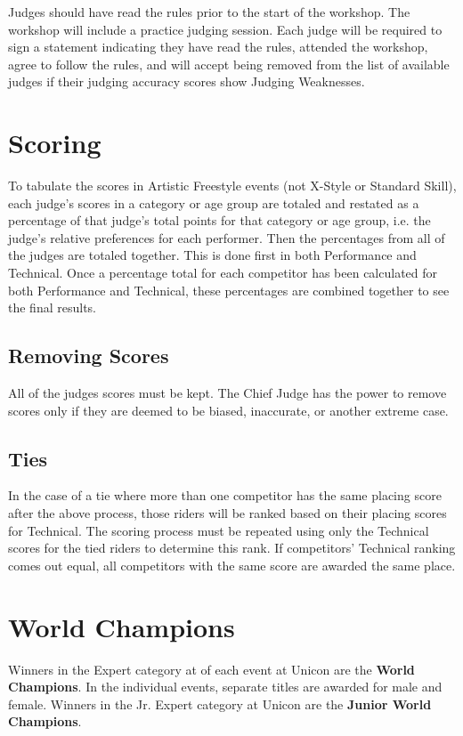 Judges should have read the rules prior to the start of the workshop.
The workshop will include a practice judging session.
Each judge will be required to sign a statement indicating they have read the rules, attended the workshop, agree to follow the rules, and will accept being removed from the list of available judges if their judging accuracy scores show Judging Weaknesses.

\section{Scoring}
To tabulate the scores in Artistic Freestyle events (not X-Style or Standard Skill), each judge's scores in a category or age group are totaled and restated as a percentage of that judge's total points for that category or age group, i.e. the judge's relative preferences for each performer.
Then the percentages from all of the judges are totaled together.
This is done first in both Performance and Technical.
Once a percentage total for each competitor has been calculated for both Performance and Technical, these percentages are combined together to see the final results.

\subsection{Removing Scores}
All of the judges scores must be kept.
The Chief Judge has the power to remove scores only if they are deemed to be biased, inaccurate, or another extreme case.

\subsection{Ties}
In the case of a tie where more than one competitor has the same placing score after the above process, those riders will be ranked based on their placing scores for Technical.
The scoring process must be repeated using only the Technical scores for the tied riders to determine this rank.
If competitors' Technical ranking comes out equal, all competitors with the same score are awarded the same place.

\section{World Champions \label{sec:freestyle_world-champions}}
Winners in the Expert category at of each event at Unicon are the \textbf{World Champions}.
In the individual events, separate titles are awarded for male and female.
Winners in the Jr. Expert category at Unicon are the \textbf{Junior World Champions}.

